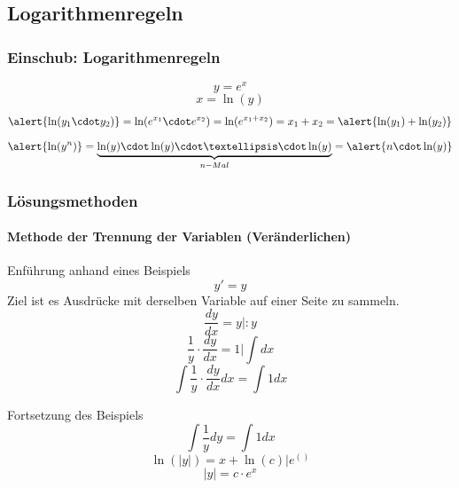 \documentclass[
	11pt, %
]{beamer}
\begin{document}
\subsection{Logarithmenregeln}
\begin{frame}
	\frametitle{Einschub: Logarithmenregeln}
	\begin{equation}
		y=e^x
	\end{equation}
	\begin{equation}
		x=\ln(y)
	\end{equation}
	\begin{equation}
	\alert{\ln(y_1\cdot y_2)}=\ln(e^{x_1}\cdot e^{x_2})=\ln(e^{x_1+x_2})=x_1+x_2=\alert{\ln(y_1)+\ln(y_2)}
	\end{equation}
	\begin{equation}
		\alert{\ln(y^n)}=\underbrace{\ln(y)\cdot \ln(y) \cdot \ldots \cdot \ln(y)}_{n-Mal}=\alert{n\cdot \ln(y)}
	\end{equation}
\end{frame}
\begin{frame}
	\frametitle{L\"osungsmethoden}
	\framesubtitle{Methode der Trennung der Variablen (Ver\"anderlichen)}
	\begin{exampleblock}{Enf\"uhrung anhand eines Beispiels}
		\begin{equation}
			y'=y
		\end{equation}
Ziel ist es Ausdr\"ucke mit derselben Variable auf einer Seite zu sammeln.
		\begin{equation}
			\frac{dy}{dx}=y\big|:y
		\end{equation}
		\begin{equation}
			\frac{1}{y}\cdot\frac{dy}{dx}=1\bigg|\int dx
		\end{equation}
		\begin{equation}
			\int\frac{1}{y}\cdot\frac{dy}{dx}dx=\int 1dx
		\end{equation}
	\end{exampleblock}
\end{frame}
\begin{frame}
	\begin{exampleblock}{Fortsetzung des Beispiels}
		\begin{equation}
			\int\frac{1}{y}dy=\int 1dx
		\end{equation}
		\begin{equation}
			\ln(\left|y\right|)=x+\ln(c)\big| e^{()}
		\end{equation}
		\begin{equation}
			\left|y\right|=c\cdot e^x
		\end{equation}
	\end{exampleblock}
\end{frame}
\end{document}
